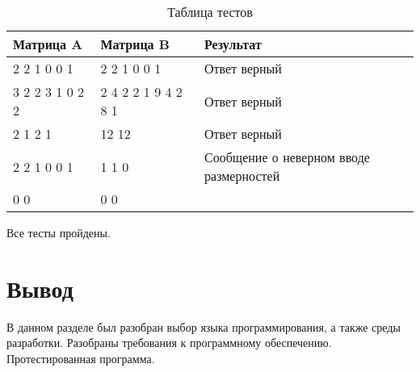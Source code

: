 \begin{table}[ht]
    \centering
    \caption{Таблица тестов}
    \label{table:ref1}
    \begin{tabular}{ | l | l | l |}
        \hline
        Матрица A       & Матрица B           & Результат                               \\ \hline
        2 2 1 0 0 1     & 2 2 1 0 0 1         & Ответ верный                            \\ \hline
        3 2 2 3 1 0 2 2 & 2 4 2 2 1 9 4 2 8 1 & Ответ верный                            \\ \hline
        2 1 2 1         & 12 12               & Ответ верный                            \\ \hline
        2 2 1 0 0 1     & 1 1 0               & Сообщение о неверном вводе размерностей \\ \hline
        0 0             & 0 0                 &                                         \\ \hline
        \hline
    \end{tabular}
\end{table}

Все тесты пройдены.

\section{Вывод}

В данном разделе был разобран выбор языка программирования, а также среды разработки.
Разобраны требования к программному обеспечению.
Протестированная программа. 
